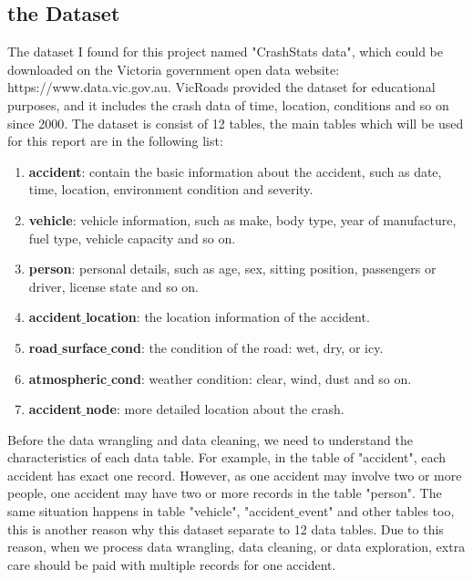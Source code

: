 \documentclass[10pt]{article}
\theoremstyle{definition}
\begin{document}
\subsection{the Dataset}
The dataset I found for this project named "CrashStats data", which could be downloaded on the Victoria government open data website: https://www.data.vic.gov.au. VicRoads provided the dataset for educational purposes, and it includes the crash data of time, location, conditions and so on since 2000. The dataset is consist of 12 tables, the main tables which will be used for this report are in the following list:
\begin{enumerate}
	\item \textbf{accident}:	contain the basic information about the accident, such as date, time, location, environment condition and severity.
	\item \textbf{vehicle}:	vehicle information, such as make, body type, year of manufacture, fuel type, vehicle capacity and so on.
	\item \textbf{person}:	personal details, such as age, sex, sitting position, passengers or driver, license state and so on.	
	\item \textbf{accident$\_$location}:	the location information of the accident.
	\item \textbf{road$\_$surface$\_$cond}:	the condition of the road: wet, dry, or icy.
	\item \textbf{atmospheric$\_$cond}:	weather condition: clear, wind, dust and so on.
	\item \textbf{accident$\_$node}:	more detailed location about the crash.
\end{enumerate}
Before the data wrangling and data cleaning, we need to understand the characteristics of each data table. For example, in the table of "accident", each accident has exact one record. However, as one accident may involve two or more people, one accident may have two or more records in the table "person". The same situation happens in table "vehicle", "accident$\_$event" and other tables too, this is another reason why this dataset separate to 12 data tables. Due to this reason, when we process data wrangling, data cleaning, or data exploration, extra care should be paid with multiple records for one accident. \par
\end{document}
